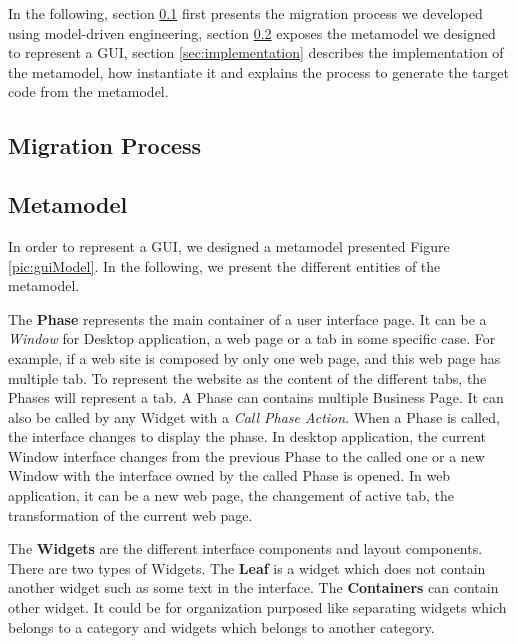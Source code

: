 \documentclass[conference]{IEEEtran}
\begin{document}
    In the following, section \ref{sec:migrationProcess} first presents the migration process we developed using model-driven engineering,
    section \ref{sec:metamodel} exposes the metamodel we designed to represent a GUI,
    section \ref{sec:implementation} describes the implementation of the metamodel, 
        how instantiate it and
        explains the process to generate the target code from the metamodel.

    \subsection{Migration Process}
    \label{sec:migrationProcess}

    
    \subsection{Metamodel}
    \label{sec:metamodel}

    In order to represent a GUI, we designed a metamodel presented Figure \ref{pic:guiModel}.
    In the following, we present the different entities of the metamodel.


    The \textbf{Phase} represents the main container of a user interface page.
    It can be a \textit{Window} for Desktop application,
        a web page or a tab in some specific case.
    For example, 
        if a web site is composed by only one web page, 
        and this web page has multiple tab.
    To represent the website as the content of the different tabs, 
        the Phases will represent a tab.
    A Phase can contains multiple Business Page.
    It can also be called by any Widget with a \textit{Call Phase Action}.
    When a Phase is called, the interface changes to display the phase.
    In desktop application, the current Window interface changes from the previous Phase to 
        the called one or a new Window with the interface owned by the called Phase is opened.
    In web application, it can be a new web page, the changement of active tab, the transformation of the current web page. 

    The \textbf{Widgets} are the different interface components and layout components.
    There are two types of Widgets.
    The \textbf{Leaf} is a widget which does not contain another widget such as some text in the interface. 
    The \textbf{Containers} can contain other widget. 
    It could be for organization purposed like separating widgets which belongs to a category and widgets which belongs to another category.
    
\end{document}
